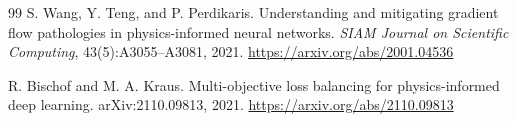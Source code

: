 \documentclass[11pt]{article}
\begin{document}
\begin{thebibliography}{99}
S. Wang, Y. Teng, and P. Perdikaris.
\newblock Understanding and mitigating gradient flow pathologies in physics-informed neural networks.
\newblock \emph{SIAM Journal on Scientific Computing}, 43(5):A3055--A3081, 2021.
\newblock \url{https://arxiv.org/abs/2001.04536}

R. Bischof and M. A. Kraus.
\newblock Multi-objective loss balancing for physics-informed deep learning.
\newblock arXiv:2110.09813, 2021.
\newblock \url{https://arxiv.org/abs/2110.09813}

\end{thebibliography}
\end{document}
